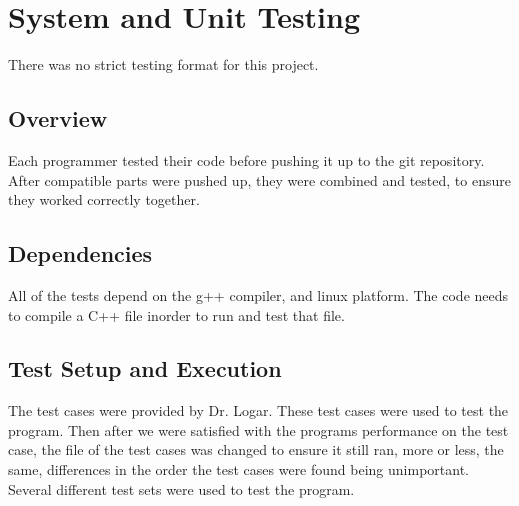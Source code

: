 
\chapter{System  and Unit Testing}

There was no strict testing format for this project.

\section{Overview}
Each programmer tested their code before pushing it up to the git repository.  After compatible parts were
pushed up, they were combined and tested, to ensure they worked correctly together.

\section{Dependencies}
All of the tests depend on the g++ compiler, and linux platform.  The code needs
to compile a C++ file inorder to run and test that file.


\section{Test Setup and Execution}
The test cases were provided by Dr. Logar.  These test cases were used to test the program.
Then after we were satisfied with the programs performance on the test case, the file of the test cases
was changed to ensure it still ran, more or less, the same, differences in the order the test cases were found
being unimportant.  Several different test sets were used to test the program.

